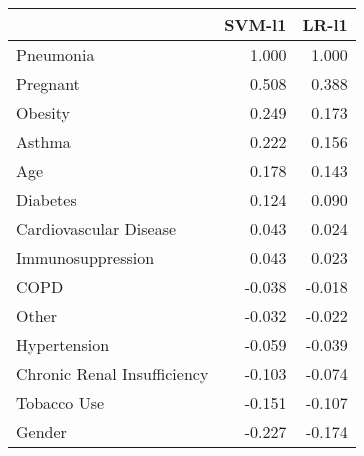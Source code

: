 \begin{tabular}{lrr}
\toprule
{} &  SVM-l1 &  LR-l1 \\
\midrule
Pneumonia                   &   1.000 &  1.000 \\
Pregnant                    &   0.508 &  0.388 \\
Obesity                     &   0.249 &  0.173 \\
Asthma                      &   0.222 &  0.156 \\
Age                         &   0.178 &  0.143 \\
Diabetes                    &   0.124 &  0.090 \\
Cardiovascular Disease      &   0.043 &  0.024 \\
Immunosuppression           &   0.043 &  0.023 \\
COPD                        &  -0.038 & -0.018 \\
Other                       &  -0.032 & -0.022 \\
Hypertension                &  -0.059 & -0.039 \\
Chronic Renal Insufficiency &  -0.103 & -0.074 \\
Tobacco Use                 &  -0.151 & -0.107 \\
Gender                      &  -0.227 & -0.174 \\
\bottomrule
\end{tabular}
